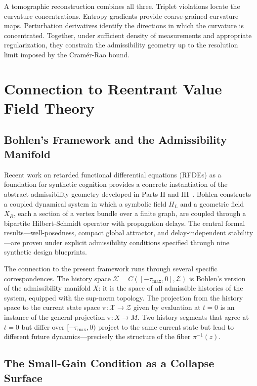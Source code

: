 \documentclass[12pt, oneside]{book}
\theoremstyle{plain-flyxion}
\theoremstyle{definition-flyxion}
\begin{document}
A tomographic reconstruction combines all three. Triplet violations locate the curvature
concentrations. Entropy gradients provide coarse-grained curvature maps. Perturbation
derivatives identify the directions in which the curvature is concentrated. Together,
under sufficient density of measurements and appropriate regularization, they constrain
the admissibility geometry up to the resolution limit imposed by the Cramér-Rao bound.

\chapter{Connection to Reentrant Value Field Theory}

\section{Bohlen's Framework and the Admissibility Manifold}

Recent work on retarded functional differential equations (RFDEs) as a foundation for
synthetic cognition provides a concrete instantiation of the abstract admissibility
geometry developed in Parts II and III~\cite{bohlen2026}. Bohlen constructs a coupled
dynamical system in which a symbolic field $H_L$ and a geometric field $X_R$, each a
section of a vertex bundle over a finite graph, are coupled through a bipartite
Hilbert-Schmidt operator with propagation delays. The central formal results---well-posedness,
compact global attractor, and delay-independent stability---are proven under explicit
admissibility conditions specified through nine synthetic design blueprints.

The connection to the present framework runs through several specific correspondences.
The history space $\mathcal{X} = C([-\tau_{\max}, 0], \mathcal{Z})$ is Bohlen's version
of the admissibility manifold $X$: it is the space of all admissible histories of the
system, equipped with the sup-norm topology. The projection from the history space to the
current state space $\pi: \mathcal{X}\to\mathcal{Z}$ given by evaluation at $t=0$ is an
instance of the general projection $\pi: X\to M$. Two history segments that agree at
$t=0$ but differ over $[-\tau_{\max}, 0)$ project to the same current state but lead to
different future dynamics---precisely the structure of the fiber $\pi^{-1}(z)$.

\section{The Small-Gain Condition as a Collapse Surface}
\end{document}
